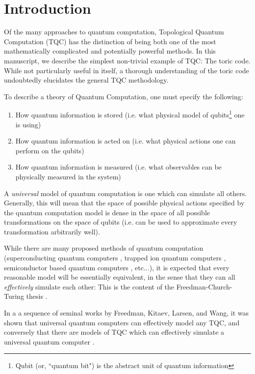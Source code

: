 \documentclass{article}
\theoremstyle{definition}
\numberwithin{figure}{section}
\begin{document}
\section{Introduction}
\label{Introduction}

Of the many approaches to quantum computation, Topological Quantum Computation (TQC) has the distinction of being both one of the most mathematically complicated and potentially powerful methods. In this manuscript, we describe the simplest non-trivial example of TQC: The toric code. While not particularly useful in itself, a thorough understanding of the toric code undoubtedly elucidates the general TQC methodology.

To describe a theory of Quantum Computation, one must specify the following:

\begin{enumerate}
\item How quantum information is stored (i.e. what physical model of qubits\footnote{Qubit (or, ``quantum bit") is the abstract unit of quantum information} one is using)
\item How quantum information is acted on (i.e. what physical actions one can perform on the qubits)
\item How quantum information is measured (i.e. what observables can be physically measured in the system)
\end{enumerate}

A \textit{universal} model of quantum computation is one which can simulate all others. Generally, this will mean that the space of possible physical actions specified by the quantum computation model is dense in the space of all possible transformations on the space of qubits (i.e. can be used to approximate every transformation arbitrarily well).

While there are many proposed methods of quantum computation (superconducting quantum computers \cite{wendin2017quantum}, trapped ion quantum computers \cite{debnath2016demonstration}, semiconductor based quantum computers \cite{kane1998silicon}, etc...), it is expected that every reasonable model will be essentially equivalent, in the sense that they can all \textit{effectively} simulate each other: This is the content of the Freedman-Church-Turing thesis \cite{freedman2003topological}.

In a a sequence of seminal works by Freedman, Kitaev, Larsen, and Wang, it was shown that universal quantum computers can effectively model any TQC, and conversely that there are models of TQC which can effectively simulate a universal quantum computer \cite{freedman2002modular} \cite{freedman2002simulation}.
\end{document}
